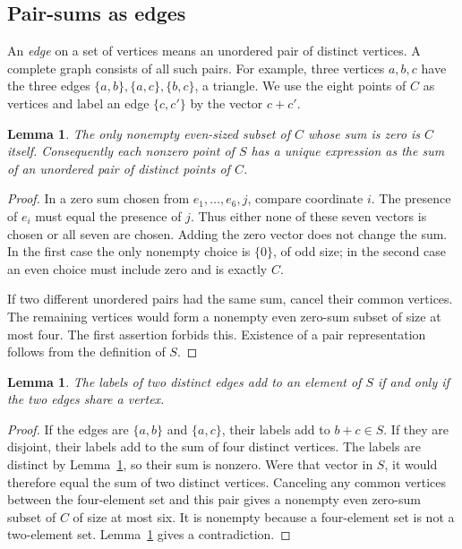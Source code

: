 \documentclass[11pt]{article}
\numberwithin{equation}{section}
\newtheorem{lemma}[theorem]{Lemma}
\theoremstyle{definition}
\theoremstyle{remark}\newtheorem{remark}[theorem]{Remark}
\begin{document}
\subsection{Pair-sums as edges}
An \emph{edge} on a set of vertices means an unordered pair of distinct vertices. A complete graph consists of all such pairs. For example, three vertices $a,b,c$ have the three edges $\{a,b\},\{a,c\},\{b,c\}$, a triangle. We use the eight points of $C$ as vertices and label an edge $\{c,c'\}$ by the vector $c+c'$.

\begin{lemma}\label{lem:relation}
The only nonempty even-sized subset of $C$ whose sum is zero is $C$ itself. Consequently each nonzero point of $S$ has a unique expression as the sum of an unordered pair of distinct points of $C$.
\end{lemma}
\begin{proof}
In a zero sum chosen from $e_1,\ldots,e_6,j$, compare coordinate $i$. The presence of $e_i$ must equal the presence of $j$. Thus either none of these seven vectors is chosen or all seven are chosen. Adding the zero vector does not change the sum. In the first case the only nonempty choice is $\{0\}$, of odd size; in the second case an even choice must include zero and is exactly $C$.

If two different unordered pairs had the same sum, cancel their common vertices. The remaining vertices would form a nonempty even zero-sum subset of size at most four. The first assertion forbids this. Existence of a pair representation follows from the definition of $S$.
\end{proof}

\begin{lemma}\label{lem:edges}
The labels of two distinct edges add to an element of $S$ if and only if the two edges share a vertex.
\end{lemma}
\begin{proof}
If the edges are $\{a,b\}$ and $\{a,c\}$, their labels add to $b+c\in S$. If they are disjoint, their labels add to the sum of four distinct vertices. The labels are distinct by Lemma~\ref{lem:relation}, so their sum is nonzero. Were that vector in $S$, it would therefore equal the sum of two distinct vertices. Canceling any common vertices between the four-element set and this pair gives a nonempty even zero-sum subset of $C$ of size at most six. It is nonempty because a four-element set is not a two-element set. Lemma~\ref{lem:relation} gives a contradiction.
\end{proof}
\end{document}
